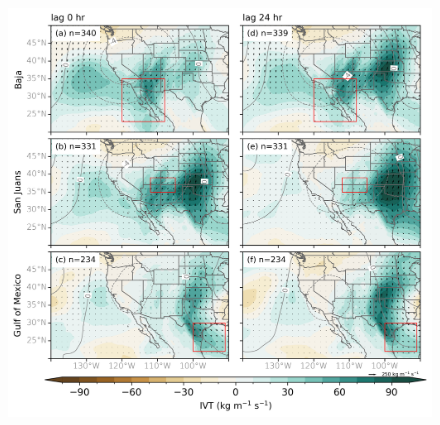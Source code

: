 \documentclass[draft]{agujournal2019}
\begin{document}
\begin{figure}
\noindent\includegraphics[width=\textwidth]{fig10.png}
\label{fig:anom_composites_MJJASO}
\caption{}
\end{figure}
\end{document}
